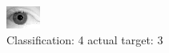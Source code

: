 \begin{figure}[h!]
\begin{center}
\includegraphics[width=0.60\columnwidth]{figures/ID2100_class_4_target_3.png}
\end{center}
\caption{ Classification: 4 actual target: 3}
\label{fig:ID2100_class_4_target_3}
\end{figure}
